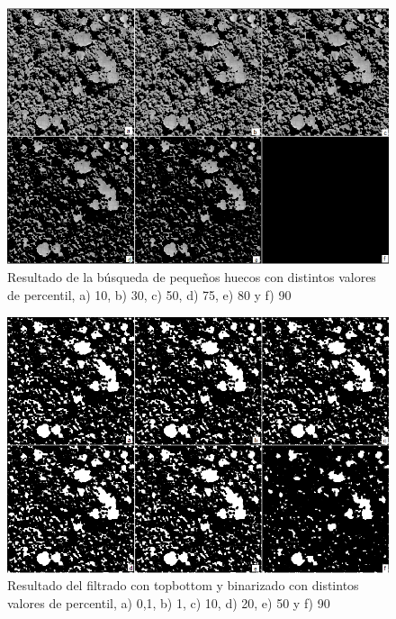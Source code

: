 \begin{figure}[H]
    \includegraphics[width=\textwidth]{Imagenes/Resultados script morfologico/GS07-labeled.png}
     \caption{Resultado de la búsqueda de pequeños huecos con distintos valores de percentil, a) 10, b) 30, c) 50, d) 75, e) 80 y f) 90 }
    \label{pequenoshuecos}
\end{figure}
\begin{figure}[h!]
    \includegraphics[width=\textwidth]{Imagenes/Resultados script morfologico/GS09-labeled.png}
     \caption{Resultado del filtrado con topbottom y binarizado con distintos valores de percentil, a) 0,1, b) 1, c) 10, d) 20, e) 50 y f) 90 }
    \label{topbottom}
\end{figure}